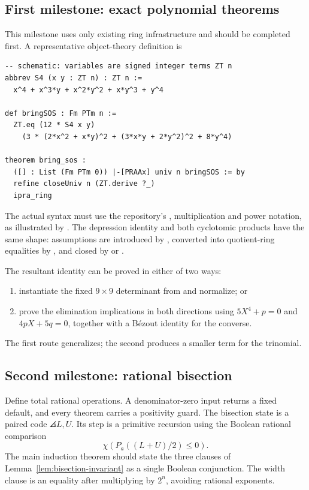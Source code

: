 \subsection{First milestone: exact polynomial theorems}

This milestone uses only existing ring infrastructure and should be completed
first.  A representative object-theory definition is
\begin{lstlisting}[style=code,language={}]
-- schematic: variables are signed integer terms ZT n
abbrev S4 (x y : ZT n) : ZT n :=
  x^4 + x^3*y + x^2*y^2 + x*y^3 + y^4

def bringSOS : Fm PTm n :=
  ZT.eq (12 * S4 x y)
    (3 * (2*x^2 + x*y)^2 + (3*x*y + 2*y^2)^2 + 8*y^4)

theorem bring_sos :
  ([] : List (Fm PTm 0)) |-[PRAAx] univ n bringSOS := by
  refine closeUniv n (ZT.derive ?_)
  ipra_ring
\end{lstlisting}
The actual syntax must use the repository's , multiplication
and power notation, as illustrated by
.  The depression identity and both
cyclotomic products have the same shape: assumptions are introduced by
, converted into quotient-ring equalities by , and
closed by  or .

The resultant identity can be proved in either of two ways:

\begin{enumerate}
\item instantiate the fixed \(9\times9\) determinant from
       and normalize; or
\item prove the elimination implications in both directions using
      \(5X^4+p=0\) and \(4pX+5q=0\), together with a Bézout identity for the
      converse.
\end{enumerate}

The first route generalizes; the second produces a smaller term for the
trinomial.

\subsection{Second milestone: rational bisection}

Define total rational operations.  A denominator-zero input returns a fixed
default, and every theorem carries a positivity guard.  The bisection state is
a paired code \(\angles{L,U}\).  Its step is a primitive recursion using the
Boolean rational comparison
\[
 \chi(P_a((L+U)/2)\le0).
\]
The main induction theorem should state the three clauses of
Lemma~\ref{lem:bisection-invariant} as a single Boolean conjunction.  The
width clause is an equality after multiplying by \(2^n\), avoiding rational
exponents.


